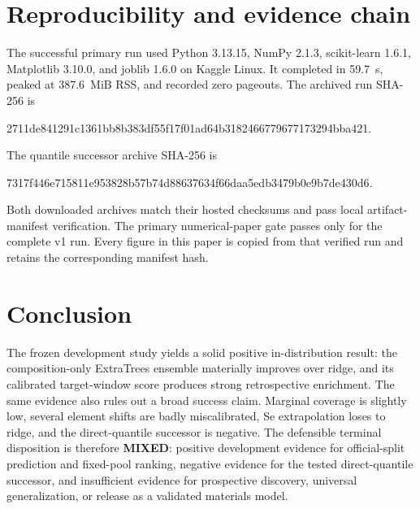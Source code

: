 \documentclass[11pt]{article}
\begin{document}
\section{Reproducibility and evidence chain}
The successful primary run used Python 3.13.15, NumPy 2.1.3, scikit-learn 1.6.1, Matplotlib 3.10.0, and joblib 1.6.0 on Kaggle Linux. It completed in 59.7~s, peaked at 387.6~MiB RSS, and recorded zero pageouts. The archived run SHA-256 is
\begin{center}
\small\ttfamily 2711de841291c1361bb8b383df55f17f01ad64b3182466779677173294bba421.
\end{center}
The quantile successor archive SHA-256 is
\begin{center}
\small\ttfamily 7317f446e715811e953828b57b74d88637634f66daa5edb3479b0e9b7de430d6.
\end{center}
Both downloaded archives match their hosted checksums and pass local artifact-manifest verification. The primary numerical-paper gate passes only for the complete v1 run. Every figure in this paper is copied from that verified run and retains the corresponding manifest hash.

\section{Conclusion}
The frozen development study yields a solid positive in-distribution result: the composition-only ExtraTrees ensemble materially improves over ridge, and its calibrated target-window score produces strong retrospective enrichment. The same evidence also rules out a broad success claim. Marginal coverage is slightly low, several element shifts are badly miscalibrated, Se extrapolation loses to ridge, and the direct-quantile successor is negative. The defensible terminal disposition is therefore \textbf{MIXED}: positive development evidence for official-split prediction and fixed-pool ranking, negative evidence for the tested direct-quantile successor, and insufficient evidence for prospective discovery, universal generalization, or release as a validated materials model.



\end{document}
